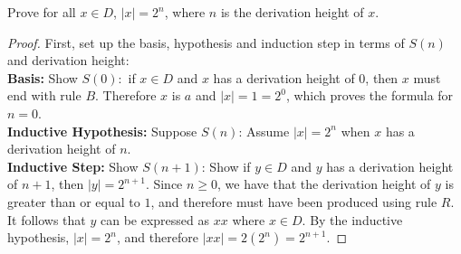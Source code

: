 \documentclass[]{exam}
\theoremstyle{definition}
\begin{document}
\begin{questions}
Prove for all $x \in D$, $|x| = 2^n$, where $n$ is the derivation height
of $x$. 
%

\begin{proof}
First, set up the basis, hypothesis and induction step in terms of $S(n)$ and
derivation height:
~\\
\textbf{Basis:} Show $S(0):$ if $x \in D$ and $x$ has a derivation height of
$0$, then $x$ must end with rule $B$. Therefore $x$ is $a$ and $|x| = 1 = 2^0$,
which proves the formula for $n = 0$.
~\\
\textbf{Inductive Hypothesis:} Suppose $S(n)$: Assume $|x| = 2^n$ when $x$ has 
a derivation height of $n$.
~\\
\textbf{Inductive Step:} Show $S(n+1)$: Show if $y \in D$ and $y$ has a
derivation height of $n + 1$, then $|y| = 2^{n + 1}$. Since $n \geq 0$,
we have that the derivation height of $y$ is greater than or equal to
$1$, and therefore must have been produced using rule $R$. It follows
that $y$ can be expressed as $xx$ where $x \in D$. By the inductive hypothesis,
$|x| = 2^n$, and therefore $|xx| = 2(2^n) = 2^{n+1}$.



\end{proof}
\end{questions}
\end{document}
